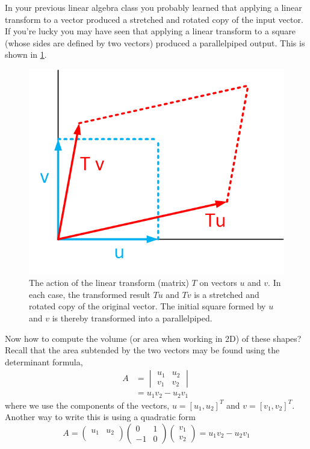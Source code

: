 \documentclass[hidelinks,notitlepage]{book}
\begin{document}
In your previous linear algebra class you probably learned that applying a linear transform to a vector produced a stretched and rotated copy of the input vector.  If you're lucky you may have seen that applying a linear transform to a square (whose sides are defined by two vectors) produced a parallelpiped output.  This is shown in 
\cref{fig:LinearTransform}. 
\begin{figure}[ht]
	\centering
	\includegraphics[width=0.5\columnwidth]{LinearTransform.png}
	\caption{The action of the linear transform (matrix) $T$ on vectors $u$ and $v$.  In each case, the transformed result $T u$ and $T v$ is a stretched and rotated copy of the original vector.  The initial square formed by $u$ and $v$ is thereby transformed into a parallelpiped.}
	\label{fig:LinearTransform}
\end{figure}
Now how to compute the volume (or area when working in 2D) of these shapes?  Recall that the area subtended by the two vectors may be found using the determinant formula,
\begin{equation}
\label{eq:AreaDeterminant}
\begin{aligned}
A &= 
\begin{vmatrix}
u_1 & u_2 \\
v_1 & v_2
\end{vmatrix} \\
&= u_1 v_2 - u_2 v_1
\end{aligned}
\end{equation}
where we use the components of the vectors, $u = [u_1, u_2]^T$ and $v = [v_1, v_2]^T$.  Another way to write this is using  a quadratic form
\begin{equation}
\label{eq:SymplecticForm}
A = 
\begin{pmatrix}
u_1 & u_2 \\
\end{pmatrix}
\begin{pmatrix}
0 & 1 \\
-1 & 0
\end{pmatrix}
\begin{pmatrix}
v_1 \\ v_2
\end{pmatrix}
= u_1 v_2 - u_2 v_1
\end{equation}
\end{document}
